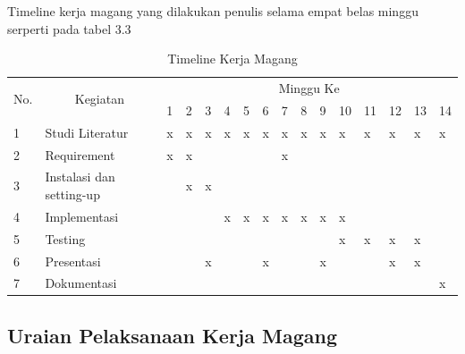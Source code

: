 \pagebreak
Timeline kerja magang yang dilakukan penulis selama empat belas minggu serperti pada tabel 3.3

\begin{table}[!htbp]
    \caption{Timeline Kerja Magang}
    \begin{tabular}{|l|l|l|l|l|l|l|l|l|l|l|l|l|l|l|l|}
    \hline
    \multicolumn{1}{|c|}{\multirow{2}{*}{No.}} & \multicolumn{1}{c|}{\multirow{2}{*}{Kegiatan}} & \multicolumn{14}{c|}{Minggu Ke}                            \\ \cline{3-16} 
    \multicolumn{1}{|c|}{}                     & \multicolumn{1}{c|}{}                          & 1 & 2 & 3 & 4 & 5 & 6 & 7 & 8 & 9 & 10 & 11 & 12 & 13 & 14 \\ \hline
    1                                          & Studi Literatur                                & x & x & x & x & x & x & x & x & x & x  & x  & x  & x  & x  \\ \hline
    2                                          & Requirement                                    & x & x &   &   &   &   & x &   &   &    &    &    &    &    \\ \hline
    3                                          & Instalasi dan setting-up                       &   & x & x &   &   &   &   &   &   &    &    &    &    &    \\ \hline
    4                                          & Implementasi                                   &   &   &   & x & x & x & x & x & x & x  &    &    &    &    \\ \hline
    5                                          & Testing                                        &   &   &   &   &   &   &   &   &   & x  & x  & x  & x  &    \\ \hline
    6                                          & Presentasi                                     &   &   & x &   &   & x &   &   & x &    &    & x  & x  &    \\ \hline
    7                                          & Dokumentasi                                    &   &   &   &   &   &   &   &   &   &    &    &    &    & x  \\ \hline
    \end{tabular}
    \end{table}


\subsection{Uraian Pelaksanaan Kerja Magang}

